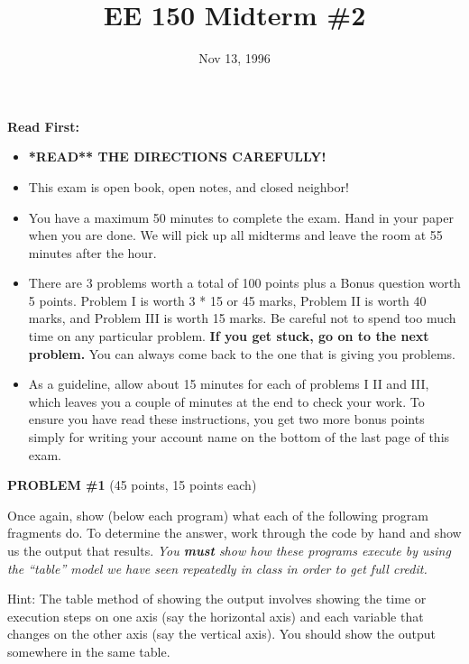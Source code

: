 \setcounter{page}{1}



\title{EE 150 Midterm \#2}
\author{Nov 13, 1996}
\date{}
\maketitle

{\bf Read First:}
\begin{itemize}
\item {\bf **READ** THE DIRECTIONS CAREFULLY!}

\item This exam is open book, open notes, and closed neighbor!

\item You have a maximum 50 minutes to complete the exam.  Hand in your paper when you are done.
We will pick up all midterms and leave the room at 55 minutes after the hour.  

\item There are 3 problems worth a total of 100 points plus a Bonus question worth 5 points.  
Problem I is worth 3 * 15 or 45 marks, Problem II is worth 40 marks, and
Problem III is worth 15 marks.   Be careful not to spend too much time on
any particular problem.  {\bf If you get stuck, go on to the next
problem.}  You can always come back to the one that is giving you
problems.  

\item As a guideline, allow about 15 minutes for each of problems I II and III,
which leaves you a couple of minutes at the end to check your work.
To ensure you have read these instructions, you get two more bonus points
simply for writing your account name on the bottom of the last page of this
exam.
\end{itemize}

\pagebreak
{\bf PROBLEM \#1} (45 points, 15 points each)
 
Once again, show (below each program) what each of the following program
fragments do.  To determine the answer, work through the code by hand and show
us the output that results.  {\em You {\bf must}  show how these programs
execute by using the  ``table'' model we have seen repeatedly in class in order
to get full credit. }  

Hint:  The table method of showing the output involves showing the time or
execution steps on one axis (say the horizontal axis) and each variable that
changes on the other axis (say the vertical axis).     You should show the
output somewhere in the same table.


